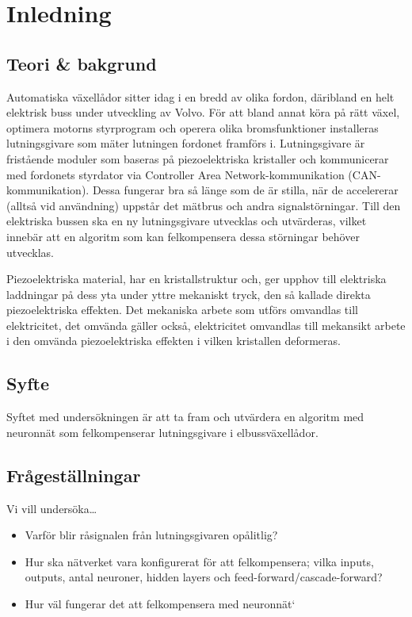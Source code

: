 \section{Inledning}
\subsection{Teori \& bakgrund}

Automatiska växellådor sitter idag i en bredd av olika fordon, däribland en
helt elektrisk buss under utveckling av Volvo.
För att bland annat köra på rätt växel, optimera motorns styrprogram och operera
olika bromsfunktioner %
installeras lutningsgivare som mäter lutningen fordonet framförs i.
Lutningsgivare är fristående moduler som baseras på piezoelektriska
kristaller och kommunicerar med fordonets styrdator via Controller
Area Network-kommunikation (CAN-kommunikation).
Dessa fungerar bra så länge som de är stilla, när de accelererar (alltså vid
användning)  uppstår det mätbrus och andra signalstörningar.
Till den elektriska bussen ska en ny lutningsgivare utvecklas och utvärderas,
vilket innebär att en algoritm som kan felkompensera dessa störningar behöver
utvecklas.


Piezoelektriska material, har en kristallstruktur och, ger upphov till
elektriska laddningar på dess yta under yttre mekaniskt tryck, den så kallade
direkta piezoelektriska effekten.
Det mekaniska arbete som utförs omvandlas till elektricitet, det omvända gäller
också, elektricitet omvandlas till mekansikt arbete i den omvända
piezoelektriska effekten i vilken kristallen deformeras.
\autocite{electronicdesign2016}

\subsection{Syfte}
Syftet med undersökningen är att ta fram och utvärdera en algoritm med neuronnät som felkompenserar lutningsgivare i elbussväxellådor.

\subsection{Frågeställningar}
Vi vill undersöka\ldots
\begin{itemize}
	\item Varför blir råsignalen från lutningsgivaren opålitlig?
	\item Hur ska nätverket vara konfigurerat för att felkompensera; vilka inputs,
		outputs, antal neuroner, hidden layers och feed-forward/cascade-forward?
	\item Hur väl fungerar det att felkompensera med neuronnät`
\end{itemize}
